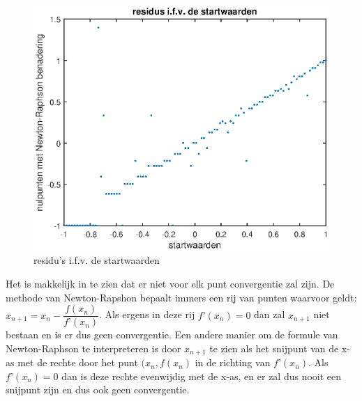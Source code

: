 \documentclass{article}
\begin{document}
\begin{center}
\begin{figure}[h!]
\includegraphics[width=0.75\columnwidth]{figuur_2}
\caption{residu’s i.f.v. de startwaarden} %
\end{figure}
\end{center}
Het is makkelijk in te zien dat er niet voor elk punt convergentie zal zijn. De methode van Newton-Rapshon bepaalt immers een rij van punten waarvoor geldt: $x_{n+1}=x_{n}-\dfrac{f(x_{n})}{f’(x_{n})}$. Als ergens in deze rij $f’(x_{n})=0$ dan zal $x_{n+1}$ niet bestaan en is er dus geen convergentie. Een andere manier om de formule van Newton-Raphson te interpreteren is door $x_{n+1}$ te zien als het snijpunt van de x-as met de rechte door het punt $(x_{n},f(x_{n})$ in de richting van $f’(x_{n})$. Als $f’(x_{n})=0$ dan is deze rechte evenwijdig met de x-as, en er zal dus nooit een snijpunt zijn en dus ook geen convergentie.
\\ \\
\end{document}
